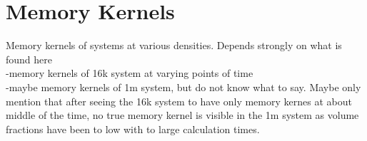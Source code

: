 \section{Memory Kernels}
\label{sec:memory_kernels}
Memory kernels of systems at various densities. Depends strongly on what is found here\\
-memory kernels of 16k system at varying points of time\\
-maybe memory kernels of 1m system, but do not know what to say. Maybe only mention that after seeing the 16k system to have only memory kernes at about middle of the time, no true memory kernel is visible in the 1m system as volume fractions have been to low with to large calculation times.\\


